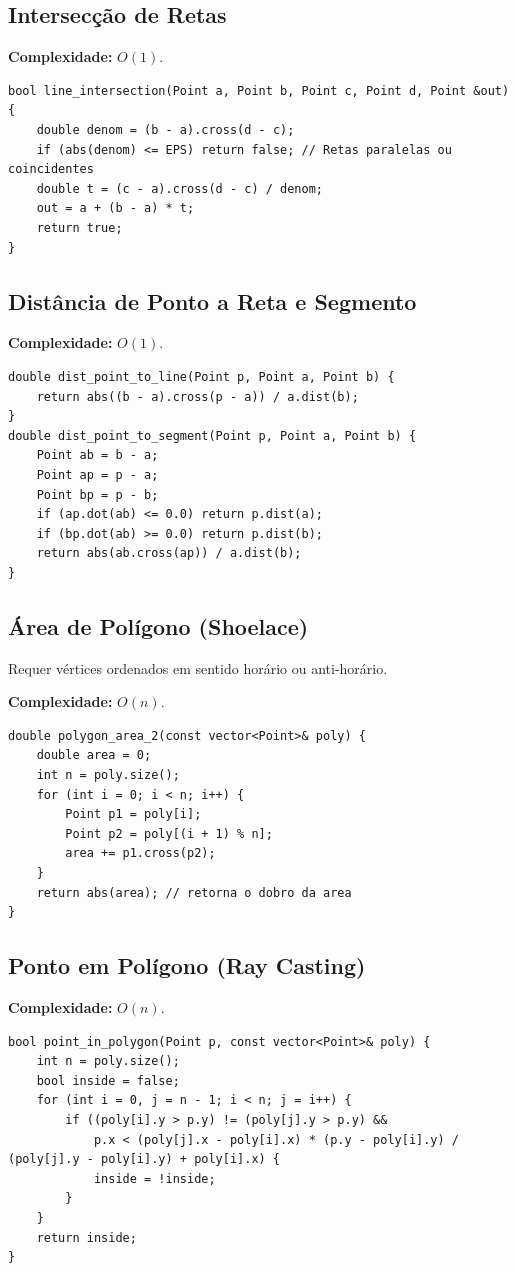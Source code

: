 \subsection{Intersecção de Retas}

\textbf{Complexidade:} $O(1)$.

\begin{lstlisting}
bool line_intersection(Point a, Point b, Point c, Point d, Point &out) {
    double denom = (b - a).cross(d - c);
    if (abs(denom) <= EPS) return false; // Retas paralelas ou coincidentes
    double t = (c - a).cross(d - c) / denom;
    out = a + (b - a) * t;
    return true;
}
\end{lstlisting}


\subsection{Distância de Ponto a Reta e Segmento}

\textbf{Complexidade:} $O(1)$.

\begin{lstlisting}
double dist_point_to_line(Point p, Point a, Point b) {
    return abs((b - a).cross(p - a)) / a.dist(b);
}
double dist_point_to_segment(Point p, Point a, Point b) {
    Point ab = b - a;
    Point ap = p - a;
    Point bp = p - b;
    if (ap.dot(ab) <= 0.0) return p.dist(a);
    if (bp.dot(ab) >= 0.0) return p.dist(b);
    return abs(ab.cross(ap)) / a.dist(b);
}
\end{lstlisting}


\subsection{Área de Polígono (Shoelace)}

Requer vértices ordenados em sentido horário ou anti-horário.

\textbf{Complexidade:} $O(n)$.

\begin{lstlisting}
double polygon_area_2(const vector<Point>& poly) {
    double area = 0;
    int n = poly.size();
    for (int i = 0; i < n; i++) {
        Point p1 = poly[i];
        Point p2 = poly[(i + 1) % n];
        area += p1.cross(p2);
    }
    return abs(area); // retorna o dobro da area
}
\end{lstlisting}


\subsection{Ponto em Polígono (Ray Casting)}

\textbf{Complexidade:} $O(n)$.

\begin{lstlisting}
bool point_in_polygon(Point p, const vector<Point>& poly) {
    int n = poly.size();
    bool inside = false;
    for (int i = 0, j = n - 1; i < n; j = i++) {
        if ((poly[i].y > p.y) != (poly[j].y > p.y) &&
            p.x < (poly[j].x - poly[i].x) * (p.y - poly[i].y) / (poly[j].y - poly[i].y) + poly[i].x) {
            inside = !inside;
        }
    }
    return inside;
}
\end{lstlisting}